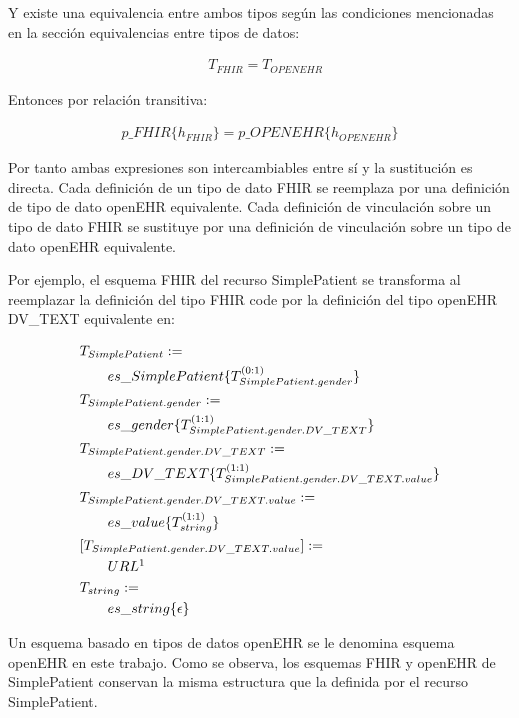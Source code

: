 \noindent
Y existe una equivalencia entre ambos tipos según las condiciones mencionadas en la sección equivalencias entre tipos de datos:

\begin{align*}
&T_{FHIR} = T_{OPENEHR}
\end{align*}

\noindent
Entonces por relación transitiva:

\begin{align*}
p\_FHIR\{h_{FHIR}\} = p\_OPENEHR\{h_{OPENEHR}\}
\end{align*}

\noindent
Por tanto ambas expresiones son intercambiables entre sí y la sustitución es directa. Cada definición de un tipo de dato FHIR se reemplaza por una definición de tipo de dato openEHR equivalente. Cada definición de vinculación sobre un tipo de dato FHIR se sustituye por una definición de vinculación sobre un tipo de dato openEHR equivalente.

Por ejemplo, el esquema FHIR del recurso SimplePatient se transforma al reemplazar la definición del tipo FHIR code por la definición del tipo openEHR DV\_TEXT equivalente en:

\begin{align*}
&T_{SimplePatient}:= \\
&\qquad es\_SimplePatient\{T_{SimplePatient.gender}^{(0:1)}\} \\
&T_{SimplePatient.gender}:= \\
&\qquad es\_gender\{T_{SimplePatient.gender.DV\_TEXT}^{(1:1)}\} \\
&T_{SimplePatient.gender.DV\_TEXT}:= \\
&\qquad es\_DV\_TEXT\{T_{SimplePatient.gender.DV\_TEXT.value}^{(1:1)}\} \\
&T_{SimplePatient.gender.DV\_TEXT.value}:= \\
&\qquad es\_value\{T_{string}^{(1:1)}\} \\
&[T_{SimplePatient.gender.DV\_TEXT.value}] := \\
&\qquad URL \footnotemark[1] \\
&T_{string}:= \\
&\qquad es\_string\{\epsilon\} \\
\end{align*}

Un esquema basado en tipos de datos openEHR se le denomina esquema openEHR en este trabajo. Como se observa, los esquemas FHIR y openEHR de SimplePatient conservan la misma estructura que la definida por el recurso SimplePatient.

